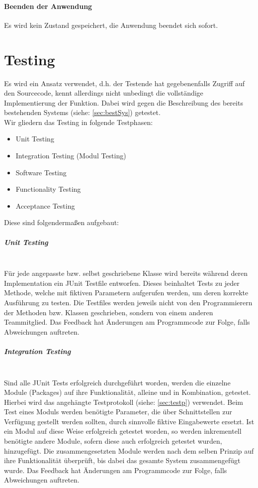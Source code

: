 \documentclass[10pt,a4paper]{article}
\newcommand{\G}[1]{\glqq\text{#1}\grqq} %
\begin{document}
\paragraph{Beenden der Anwendung}
Es wird kein Zustand gespeichert, die Anwendung beendet sich sofort.
\section{Testing}
Es wird ein \G{Grey Box testing} Ansatz verwendet, d.h. der Testende hat gegebenenfalls Zugriff auf den Sourcecode, kennt allerdings nicht unbedingt die vollständige Implementierung der Funktion. Dabei wird gegen die Beschreibung des bereits bestehenden Systems (siehe: \autoref{sec:bestSys}) getestet.\\
Wir gliedern das Testing in folgende Testphasen:
{\small\begin{itemize}
\item Unit Testing
\item Integration Testing (Modul Testing)
\item Software Testing
\item Functionality Testing
\item Acceptance Testing\\
\end{itemize}}
Diese sind folgendermaßen aufgebaut:
\subparagraph{Unit Testing}\ \\
Für jede angepasste bzw. selbst geschriebene Klasse wird bereits während deren Implementation ein JUnit Testfile entworfen. Dieses beinhaltet Tests zu jeder Methode, welche mit fiktiven Parametern aufgerufen werden, um deren korrekte Ausführung zu testen. Die Testfiles werden jeweils nicht von den Programmierern der Methoden bzw. Klassen geschrieben, sondern von einem anderen Teammitglied. Das Feedback hat Änderungen am Programmcode zur Folge, falls Abweichungen auftreten.

\subparagraph{Integration Testing}\ \\
Sind alle JUnit Tests erfolgreich durchgeführt worden, werden die einzelne Module (Packages) auf ihre Funktionalität, alleine und in Kombination, getestet. Hierbei wird das angehängte Testprotokoll (siehe: \autoref{sec:testp}) verwendet. Beim Test eines Moduls werden benötigte Parameter, die über Schnittstellen zur Verfügung gestellt werden sollten, durch sinnvolle fiktive Eingabewerte ersetzt. Ist ein Modul auf diese Weise erfolgreich getestet worden, so werden inkrementell benötigte andere Module, sofern diese auch erfolgreich getestet wurden, hinzugefügt. Die zusammengesetzten Module werden nach dem selben Prinzip auf ihre Funktionalität überprüft, bis dabei das gesamte System zusammengefügt wurde. Das Feedback hat Änderungen am Programmcode zur Folge, falls Abweichungen auftreten.
\end{document}
